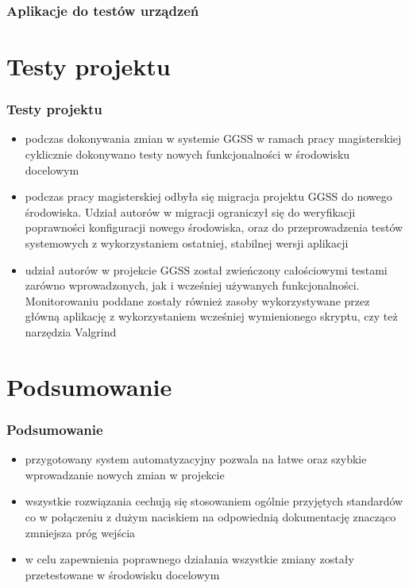 \documentclass[10pt]{beamer}
\begin{document}
\begin{frame}
    \frametitle{Aplikacje do testów urządzeń}
    
\end{frame}

\section{Testy projektu}

\begin{frame}
\frametitle{Testy projektu}
    \begin{itemize}
        \item podczas dokonywania zmian w systemie GGSS w ramach pracy magisterskiej cyklicznie dokonywano testy nowych funkcjonalności w środowisku docelowym
        \item podczas pracy magisterskiej odbyła się migracja projektu GGSS do nowego środowiska. Udział autorów w migracji ograniczył się do weryfikacji poprawności konfiguracji nowego środowiska, oraz do przeprowadzenia testów systemowych z wykorzystaniem ostatniej, stabilnej wersji aplikacji
        \item udział autorów w projekcie GGSS został zwieńczony całościowymi testami zarówno wprowadzonych, jak i wcześniej używanych funkcjonalności. Monitorowaniu poddane zostały  również zasoby wykorzystywane przez główną aplikację z wykorzystaniem wcześniej wymienionego skryptu, czy też narzędzia Valgrind
    \end{itemize}
\end{frame}

\section{Podsumowanie}

\begin{frame}
\frametitle{Podsumowanie}
    \begin{itemize}
        \item przygotowany system automatyzacyjny pozwala na łatwe oraz szybkie wprowadzanie nowych zmian w projekcie
        \item wszystkie rozwiązania cechują się stosowaniem ogólnie przyjętych standardów co w połączeniu z dużym naciskiem na odpowiednią dokumentację znacząco zmniejsza próg wejścia
        \item w celu zapewnienia poprawnego działania wszystkie zmiany zostały przetestowane w środowisku docelowym
    \end{itemize}
\end{frame}
\end{document}
